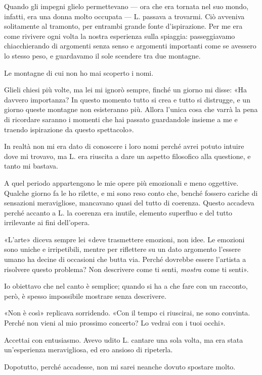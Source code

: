 Quando gli impegni glielo permettevano --- ora che era tornata nel suo mondo, infatti, era una donna
molto occupata --- L. passava a trovarmi. Ciò avveniva solitamente al tramonto, per entrambi grande
fonte d'ispirazione. Per me era come rivivere ogni volta la nostra esperienza sulla spiaggia:
passeggiavamo chiacchierando di argomenti senza senso e argomenti importanti come se avessero lo
stesso peso, e guardavamo il sole scendere tra due montagne.

Le montagne di cui non ho mai scoperto i nomi.

Glieli chiesi più volte, ma lei mi ignorò sempre, finché un giorno mi disse: «Ha davvero importanza?
In questo momento tutto si crea e tutto si distrugge, e un giorno queste montagne non esisteranno
più. Allora l'unica cosa che varrà la pena di ricordare saranno i momenti che hai passato
guardandole insieme a me e traendo ispirazione da questo spettacolo».

In realtà non mi era dato di conoscere i loro nomi perché avrei potuto intuire dove mi trovavo, ma
L. era riuscita a dare un aspetto filosofico alla questione, e tanto mi bastava.

A quel periodo appartengono le mie opere più emozionali e meno oggettive. Qualche giorno fa le ho
rilette, e mi sono reso conto che, benché fossero cariche di sensazioni meravigliose, mancavano
quasi del tutto di coerenza. Questo accadeva perché accanto a L. la coerenza era inutile, elemento
superfluo e del tutto irrilevante ai fini dell'opera.

«L'arte» diceva sempre lei «deve trasmettere emozioni, non idee. Le emozioni sono uniche e
irripetibili, mentre per riflettere su un dato argomento l'essere umano ha decine di occasioni che
butta via. Perché dovrebbe essere l'artista a risolvere questo problema? Non descrivere come ti
senti, \emph{mostra} come ti senti».

Io obiettavo che nel canto è semplice; quando si ha a che fare con un racconto, però, è spesso
impossibile mostrare senza descrivere.

«Non è così» replicava sorridendo. «Con il tempo ci riuscirai, ne sono convinta. Perché non vieni al
mio prossimo concerto? Lo vedrai con i tuoi occhi».

Accettai con entusiasmo. Avevo udito L. cantare una sola volta, ma era stata un'esperienza
meravigliosa, ed ero ansioso di ripeterla.

Dopotutto, perché accadesse, non mi sarei neanche dovuto spostare molto.
